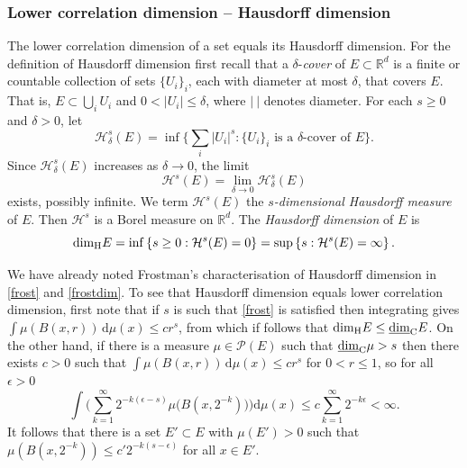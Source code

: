 \documentclass[12pt]{article}
\newcommand{\1}{{\bf 1}}
\newcommand\lcod{\underline{\mbox{\rm dim}}_{\rm C}} %
\newcommand\hdd{\mbox{\rm dim}_{\rm H}} %
\newcommand{\R}{\mathbb{R}}
\begin{document}
\subsubsection{Lower correlation dimension -- Hausdorff dimension}\label{lcdhd}

The lower correlation dimension of a set equals its Hausdorff dimension.
For the definition of Hausdorff dimension first recall that a $\delta$-{\it cover } of $E\subset\R^d$ is a finite or countable collection of sets $\{U_i\}_i$, each with diameter at most $\delta$, that covers $E$. That is, $E \subset \bigcup_i U_i$ and $0<|U_i|\leq \delta$, where $|\ |$ denotes diameter.  For each $s\geq0$ and $\delta>0$, let
\begin{equation*}
	\mathcal{H}_\delta^s(E)=\inf\Big\{ \sum_i |U_i|^s:\{U_i\}_i \text{ is a } \delta\text{-cover of }E\Big\}.
\end{equation*}
Since $\mathcal{H}_\delta^s(E)$ increases as $\delta\rightarrow0$, the limit 
\begin{equation*}
	\mathcal{H}^s(E)=\lim_{\delta\rightarrow0}\mathcal{H}_\delta^s(E)
\end{equation*}
exists, possibly infinite. We term $\mathcal{H}^s(E)$ the {\it $s$-dimensional Hausdorff measure} of $E$. Then $\mathcal{H}^s$ is a Borel measure on $\R^d$.
The {\it Hausdorff dimension} of $E$ is 
\begin{equation*}
	\hdd E=\inf\left\lbrace s\geq0:\mathcal{H}^s(E)=0\right\rbrace=\sup\left\lbrace s:\mathcal{H}^s(E)=\infty\right\rbrace.
\end{equation*}

We have already noted Frostman's characterisation of Hausdorff dimension in \eqref{frost} and \eqref{frostdim}. To see that Hausdorff dimension equals lower correlation dimension, 
first note that if $s$ is such that \eqref{frost} is satisfied then integrating gives $\int\mu(B(x,r))\,\mathrm{d} \mu(x) \leq c r^s$, from which if follows that $\hdd E  \leq \lcod E$. On the other hand, 
 if  there is a measure $\mu\in \mathcal{P}(E)$ such that $\lcod \mu >s$ then there exists $c>0$ such that $\int\mu(B(x,r))\,\mathrm{d} \mu(x) \leq c r^s$ for $0<r\leq 1$, so for all $\epsilon >0$ 
\begin{equation}\label{infsum}
\int \Big(\sum_{k=1}^\infty 2^{-k(\epsilon-s)}\mu\big(B(x,2^{-k})\big)\Big)\mathrm{d}\mu(x) \leq c\sum_{k=1}^\infty 2^{-k\epsilon}  <\infty.
\end{equation}
It follows that  there is a set $E' \subset E$ with $\mu (E')>0$ such that $\mu(B(x,2^{-k}))\leq c'2^{-k(s-\epsilon)}$ for all $x \in E'$.
 
\end{document}
